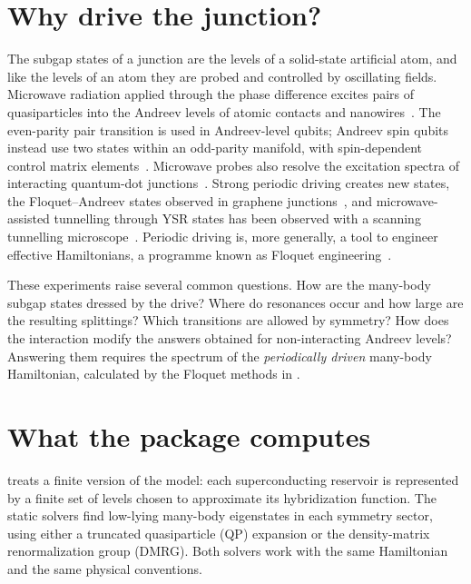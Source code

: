 \section{Why drive the junction?}

The subgap states of a junction are the levels of a solid-state artificial atom, and
like the levels of an atom they are probed and controlled by oscillating fields.
Microwave radiation applied through the phase difference excites pairs of
quasiparticles into the Andreev levels of atomic contacts and
nanowires~\cite{bretheau2013exciting,bretheau2013supercurrent,janvier2015coherent,vanwoerkom2017microwave,hays2018direct}.
The even-parity pair transition is used in Andreev-level qubits; Andreev spin
qubits instead use two states within an odd-parity manifold, with spin-dependent
control matrix elements~\cite{desposito2001controlled,zazunov2003andreev,chtchelkatchev2003andreev,padurariu2010theoretical,hays2021coherent,pitavidal2023direct}.
Microwave probes also resolve the excitation spectra of interacting quantum-dot
junctions~\cite{tosi2019spinorbit,matutecanadas2022signatures,fatemi2022microwave,bargerbos2023spectroscopy,wesdorp2023dynamical}.
Strong periodic driving creates new states, the Floquet--Andreev states
observed in graphene junctions~\cite{park2022steady}, and microwave-assisted tunnelling
through YSR states has been observed with a scanning tunnelling
microscope~\cite{kot2020microwaveassisted,peters2020resonant,acerogonzalez2020photonassisted}.
Periodic driving is, more generally, a tool to engineer effective Hamiltonians, a
programme known as Floquet engineering~\cite{goldman2014periodically,bukov2015universal,eckardt2017colloquium,oka2019floquet,rudner2020band}.

These experiments raise several common questions. How are the many-body subgap states
dressed by the drive? Where do resonances occur and how large are the resulting
splittings? Which transitions are allowed by symmetry? How does the interaction modify
the answers obtained for non-interacting Andreev levels? Answering them requires the
spectrum of the \emph{periodically driven} many-body Hamiltonian, calculated by the
Floquet methods in \pkg{}.

\section{What the package computes}

\pkg{} treats a finite version of the model: each superconducting reservoir is
represented by a finite set of levels chosen to approximate its hybridization function. The
static solvers find low-lying many-body eigenstates in each symmetry sector, using either a
truncated quasiparticle (QP) expansion or the density-matrix renormalization group
(DMRG). Both solvers work with the same Hamiltonian and the same physical conventions.

